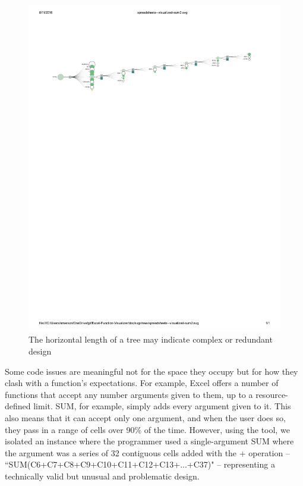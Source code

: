 \documentclass[conference]{IEEEtran}
\begin{document}
	\begin{figure}[h] \centering \includegraphics[width=\textwidth]{longsum}
		\caption{The horizontal length of a tree may indicate complex or redundant
			design} \label{fig:longsum} \end{figure}
	
	Some code issues are meaningful not for the space they occupy but for how they
	clash with a function's expectations. For example, Excel offers a number of
	functions that accept any number arguments given to them, up to a
	resource-defined limit. SUM, for example, simply adds every argument given to
	it. This also means that it can accept only one argument, and when the user
	does so, they pass in a range of cells over 90\% of the time. However, using
	the tool, we isolated an instance where the programmer used a single-argument
	SUM where the argument was a series of 32 contiguous cells added with the +
	operation -- ``SUM(C6+C7+C8+C9+C10+C11+C12+C13+...+C37)" -- representing a
	technically valid but unusual and problematic design.
	
\end{document}
